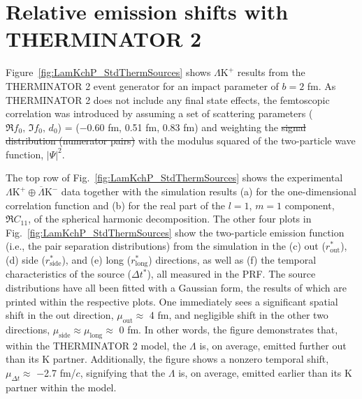 \documentclass[ALICE,manyauthors]{cernphprep}
\newcommand{\Lam}{$\Lambda$\xspace}
\newcommand{\LamKchP}{$\Lambda\mathrm{K^{+}}$\xspace}
\providecommand{\DIFaddtex}[1]{{\protect\color{blue}\uwave{#1}}} %
\providecommand{\DIFdeltex}[1]{{\protect\color{red}\sout{#1}}}                      %
\providecommand{\DIFaddbegin}{} %
\providecommand{\DIFaddend}{} %
\providecommand{\DIFdelbegin}{} %
\providecommand{\DIFdelend}{} %
\providecommand{\DIFadd}[1]{\texorpdfstring{\DIFaddtex{#1}}{#1}} %
\providecommand{\DIFdel}[1]{\texorpdfstring{\DIFdeltex{#1}}{}} %
\begin{document}
\section{Relative emission shifts with THERMINATOR 2}
\label{App:THERM}

Figure~\ref{fig:LamKchP_StdThermSources} shows \LamKchP results from the THERMINATOR 2 event generator for an impact parameter of $b = 2$ fm.
As THERMINATOR 2 does not include any final state effects, the femtoscopic correlation was introduced by assuming a set of scattering parameters ($\Re f_{0},\, \Im f_{0},\, d_{0}$) = ($-$0.60 fm, 0.51 fm, 0.83 fm) and weighting the \DIFdelbegin \DIFdel{signal distribution (numerator pairs) }\DIFdelend \DIFaddbegin \DIFadd{pairs in the signal distribution }\DIFaddend with the modulus squared of the two-particle wave function, $|\Psi|^{2}$.

The top row of Fig.~\ref{fig:LamKchP_StdThermSources} shows the experimental $\Lambda\mathrm{K}^{+}\oplus\overline{\Lambda}\mathrm{K}^{-}$ data together with the simulation results (a) for the one-dimensional correlation function and (b) for the real part of the $l=1$, $m=1$ component, $\Re C_{11}$, of the spherical harmonic decomposition.
The other four plots in Fig.~\ref{fig:LamKchP_StdThermSources} show the two-particle emission function (i.e., the pair separation distributions) from the simulation in the (c) out ($r^{*}_{\mathrm{out}}$), (d) side ($r^{*}_{\mathrm{side}}$), and (e) long ($r^{*}_{\mathrm{long}}$) directions, as well as (f) the temporal characteristics of the source ($\Delta t^{*}$), all measured in the PRF.
The source distributions have all been fitted with a Gaussian form, the results of which are printed within the respective plots.
One immediately sees a significant spatial shift in the out direction, $\mu_{\mathrm{out}} \approx$ 4 fm, and negligible shift in the other two directions, $\mu_{\mathrm{side}} \approx \mu_{\mathrm{long}} \approx$ 0 fm.
In other words, the figure demonstrates that, within the THERMINATOR 2 model, the \Lam is, on average, emitted further out than its K partner.
Additionally, the figure shows a nonzero temporal shift, $\mu_{\Delta t} \approx$ $-$2.7 fm/$c$, signifying that the \Lam is, on average, emitted earlier than its K partner within the model. 
\end{document}
